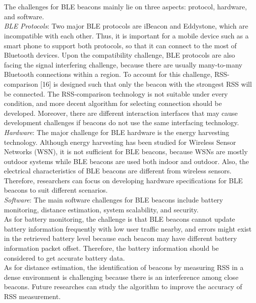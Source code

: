 \documentclass[conference]{IEEEtran}
\begin{document}
\\
\\
\text{\quad} The challenges for BLE beacons mainly lie on three aspects: protocol, hardware, and software.\\
\text{\quad} \textit{BLE Protocols}: Two major BLE protocols are iBeacon and Eddystone, which are incompatible with each other. Thus, it is important for a mobile device such as a smart phone to support both protocols, so that it can connect to the most of Bluetooth devices. Upon the compatibility challenge, BLE protocols are also facing the signal interfering challenge, because there are usually many-to-many Bluetooth connections within a region. To account for this challenge, RSS-comparison [16] is designed such that only the beacon with the strongest RSS will be connected. The RSS-comparison technology is not suitable under every condition, and more decent algorithm for selecting connection should be developed. Moreover, there are different interaction interfaces that may cause development challenges if beacons do not use the same interfacing technology. \\
\text{\quad} \textit{Hardware}: The major challenge for BLE hardware is the energy harvesting technology. Although energy harvesting has been studied for Wireless Sensor Networks (WSN), it is not sufficient for BLE beacons, because WSNs are mostly outdoor systems while BLE beacons are used both indoor and outdoor. Also, the electrical characteristics of BLE beacons are different from wireless sensors. Therefore, researchers can focus on developing hardware specifications for BLE beacons to suit different scenarios. \\
\text{\quad} \textit{Software}: The main software challenges for BLE beacons include battery monitoring, distance estimation, system scalability, and security.\\
\text{\quad} As for battery monitoring, the challenge is that BLE beacons cannot update battery information frequently with low user traffic nearby, and errors might exist in the retrieved battery level because each beacon may have different battery information packet offset. Therefore, the battery information should be considered to get accurate battery data. \\
\text{\quad} As for distance estimation, the identification of beacons by measuring RSS in a dense environment is challenging because there is an interference among close beacons. Future researches can study the algorithm to improve the accuracy of RSS measurement. \\
\end{document}
